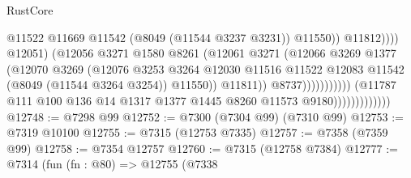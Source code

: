 \begin{lexlean}{RustCore}
\begin{coremodule}
                                                              @11522
                                                              @11669
                                                              @11542
                                                              (@8049 (@11544 @3237 @3231))
                                                              @11550))
                                                          @11812))))
                                                  @12051)
                                                (@12056
                                                  @3271
                                                  @1580
                                                  @8261
                                                  (@12061
                                                    @3271
                                                    (@12066
                                                      @3269
                                                      @1377
                                                      (@12070
                                                        @3269
                                                        (@12076
                                                          @3253
                                                          @3264
                                                          @12030
                                                          @11516
                                                          @11522
                                                          @12083
                                                          @11542
                                                          (@8049 (@11544 @3264 @3254))
                                                          @11550))
                                                      @11811))
                                                  @8737)))))))))))
                            (@11787
                              @111
                              @100
                              @136
                              @14
                              @1317
                              @1377
                              @1445
                              @8260
                              @11573
                              @9180)))))))))))))
@12748 := @7298 @99
@12752 := @7300 (@7304 @99) (@7310 @99)
@12753 := @7319 @10100
@12755 := @7315 (@12753 @7335)
@12757 := @7358 (@7359 @99)
@12758 := @7354 @12757
@12760 := @7315 (@12758 @7384)
@12777 := @7314
    (fun (fn : @80) =>
    @12755
      (@7338

\end{coremodule}
\end{lexlean}
